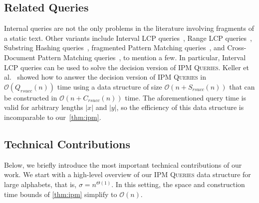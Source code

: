 \documentclass[a4paper]{article}
\theoremstyle{definition}
\theoremstyle{remark}
\newcommand{\IPM}{\textsc{IPM Queries}\xspace}
\newcommand{\Oh}{\mathcal{O}}
\newcommand{\rsucc}{\mathit{rsucc}}
\begin{document}
\subsection{Related Queries}\label{sec:related}
Internal queries are not the only problems in the literature involving fragments of a static text.
Other variants include
Interval LCP queries~\cite{DBLP:conf/soda/CormodeM05,DBLP:journals/tcs/KellerKFL14},
Range LCP queries~\cite{DBLP:conf/cocoon/Abedin0HNSST18,RangeLCP,DBLP:conf/spire/AmirLT15,DBLP:conf/spire/PatilST13},
Substring Hashing queries~\cite{DBLP:conf/cpm/FarachM96,DBLP:conf/esa/Gawrychowski11,DBLP:conf/esa/GawrychowskiLN14},
fragmented Pattern Matching queries~\cite{DBLP:journals/talg/AmirLLS07,DBLP:conf/esa/GawrychowskiLN14},
and Cross-Document Pattern Matching queries~\cite{DBLP:journals/jda/KopelowitzKNS14}, to mention a few.
In particular, Interval LCP queries can be used to solve the decision version of \IPM.
Keller et al.~\cite{DBLP:journals/tcs/KellerKFL14}
showed how to answer the decision version of \IPM in $\Oh(Q_{\rsucc}(n))$ time
using a data structure of size $\Oh(n+S_{\rsucc}(n))$ that can be constructed in $\Oh(n+C_{\rsucc}(n))$ time.
The aforementioned query time is valid for arbitrary lengths $|x|$ and $|y|$,
so the efficiency of this data structure is incomparable to our~\cref{thm:ipm}.

\subsection{Technical Contributions}\label{sec:techniques}
Below, we briefly introduce the most important technical contributions of our work.
We start with a high-level overview of our \IPM data structure for large alphabets,
that is, $\sigma = n^{\Theta(1)}$.
In this setting, the space and construction time bounds of \cref{thm:ipm} simplify to $\Oh(n)$.
\end{document}
